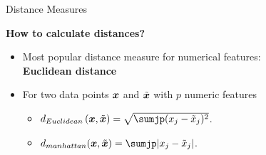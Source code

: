 \documentclass[11pt,compress,t,notes=noshow, xcolor=table]{beamer}
\begin{document}
\begin{vbframe}{Distance Measures}

\textbf{How to calculate distances?}
  \begin{itemize}
    \item Most popular distance measure for numerical features: \\
    \textbf{Euclidean distance}
    \item For two data points $\bm{x}$ and $\tilde{\bm{x}}$ with $p$ numeric features
      \begin{itemize}
        \item $d_{Euclidean}\left(\xv, \tilde{\xv}\right) = \sqrt{\sumjp(x_j- \tilde{x}_j)^2}$.
      
        \item $d_{manhattan}(\xv, \tilde{\xv}) = \sumjp |x_j - \tilde{x}_j|$.
      \end{itemize}   
    \end{itemize}

    


\end{vbframe}
\end{document}
